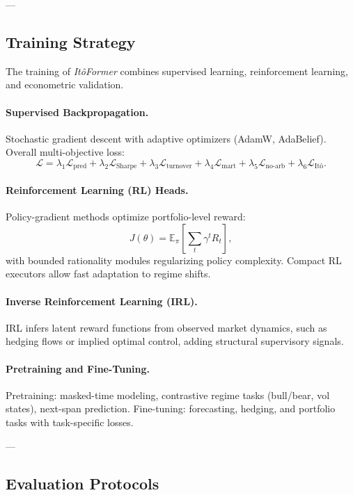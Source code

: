 \documentclass[10pt,twocolumn]{article}
\begin{document}
---

\subsection{Training Strategy}

The training of \emph{It\^oFormer} combines supervised learning, reinforcement learning, and econometric validation.  

\paragraph{Supervised Backpropagation.}
Stochastic gradient descent with adaptive optimizers (AdamW, AdaBelief). Overall multi-objective loss:  
\[
\mathcal{L} = 
\lambda_1 \mathcal{L}_{\text{pred}}
+ \lambda_2 \mathcal{L}_{\text{Sharpe}}
+ \lambda_3 \mathcal{L}_{\text{turnover}}
+ \lambda_4 \mathcal{L}_{\text{mart}}
+ \lambda_5 \mathcal{L}_{\text{no-arb}}
+ \lambda_6 \mathcal{L}_{\text{It\^o}}.
\]

\paragraph{Reinforcement Learning (RL) Heads.}
Policy-gradient methods optimize portfolio-level reward:  
\[
J(\theta) = \mathbb{E}_\pi \!\left[ \sum_{t} \gamma^t R_t \right],
\]
with bounded rationality modules regularizing policy complexity. Compact RL executors allow fast adaptation to regime shifts.

\paragraph{Inverse Reinforcement Learning (IRL).}
IRL infers latent reward functions from observed market dynamics, such as hedging flows or implied optimal control, adding structural supervisory signals.  

\paragraph{Pretraining and Fine-Tuning.}
Pretraining: masked-time modeling, contrastive regime tasks (bull/bear, vol states), next-span prediction.  
Fine-tuning: forecasting, hedging, and portfolio tasks with task-specific losses.

---

\subsection{Evaluation Protocols}
\end{document}
